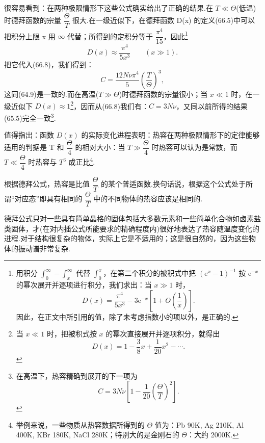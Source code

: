 很容易看到：在两种极限情形下这些公式确实给出了正确的结果.在 $T\ll\Theta$(低温)时德拜函数的宗量 $\dfrac{\Theta}{T}$ 很大.在一级近似下，在德拜函数 D(x) 的定义(66.5)中可以把积分上限 x 用 $\infty$ 代替；所得到的定积分等于 $\dfrac{\pi^4}{15}$，因此\footnote{用积分 $\int_0^\infty-\int_x^\infty$ 代替 $\int_0^x$，在第二个积分的被积式中把 $(\mathrm{e}^x-1)^{-1}$ 按 $\mathrm{e}^{-x}$ 的幂次展开并逐项进行积分，我们求出：当 $x\gg1$ 时，
\begin{equation*}
  D(x)=\frac{\pi^4}{5x^3}-3\mathrm{e}^{-x}\left[1+O\left(\frac{1}{x}\right)\right].
\end{equation*}
因此，在正文中所引用的值，除了未考虑指数小的项以外，是正确的.}
\begin{equation*}
  D(x)\approx\frac{\pi^4}{5x^3}\qquad(x\gg1).
\end{equation*}
把它代入(66.8)，我们得到：
\begin{equation}
  C=\frac{12N\nu\pi^4}{5}\left(\frac{T}{\Theta}\right)^3,
\end{equation}
这同(64.9)是一致的.而在高温($T\gg\Theta$)时德拜函数的宗量很小；当 $x\ll1$ 时，在一级近似下 $D(x)\approx1$\footnote{当 $x\ll1$ 时，把被积式按 $x$ 的幂次直接展开并逐项积分，就得出
\begin{equation*}
  D(x)=1-\frac{3}{8}x+\frac{1}{20}x^2-\cdots.
\end{equation*}}，因而从(66.8)我们有：$C=3N\nu$，又同以前所得的结果(65.5)完全一致\footnote{在高温下，热容精确到展开的下一项为
\begin{equation*}
  C=3N\nu\left[1-\frac{1}{20}\left(\frac{\Theta}{T}\right)^2\right].
\end{equation*}}.

值得指出：函数 $D(x)$ 的实际变化进程表明：热容在两种极限情形下的定律能够适用的判据是 T 和 $\dfrac{\Theta}{4}$ 的相对大小：当 $T\gg\dfrac{\Theta}{4}$ 时热容可以认为是常数，而 $T\ll\dfrac{\Theta}{4}$ 时热容与 $T^3$ 成正比\footnote{举例来说，一些物质从热容数据所得到的 $\Theta$ 值为：Pb 90K, Ag 210K, Al 400K, KBr 180K, NaCl 280K；特别大的是金刚石的 $\Theta$：大约 2000K.}.

根据德拜公式，热容是比值 $\dfrac{\Theta}{T}$ 的某个普适函数.换句话说，根据这个公式处于所谓“对应态”即具有相同的 $\dfrac{\Theta}{T}$ 中的不同物体的热容应该是相同的.

德拜公式只对一些具有简单晶格的固体包括大多数元素和一些简单化合物如卤素盐类固体，才(在对内插公式所能要求的精确程度内)很好地表达了热容随温度变化的进程.对于结构很复杂的物体，实际上它是不适用的；这是很自然的，因为这些物体的振动谱非常复杂.

